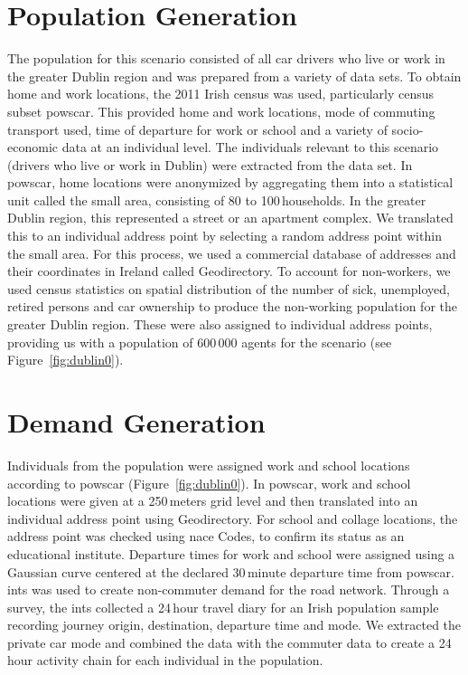 \section{Population Generation}
The population for this scenario consisted of all car drivers who live or work in the greater Dublin region and was prepared from a variety of data sets. To obtain home and work locations, the 2011 Irish census was used, particularly census subset \gls{powscar}. This provided home and work locations, mode of commuting transport used, time of departure for work or school and a variety of socio-economic data at an individual level. The individuals relevant to this scenario (drivers who live or work in Dublin) were extracted from the data set. In \gls{powscar}, home locations were anonymized by aggregating them into a statistical unit called the small area, consisting of 80 to 100\,households.  In the greater Dublin region, this represented a street or an apartment complex. We translated this to an individual address point by selecting a random address point within the small area. For this process, we used a commercial database of addresses and their coordinates in Ireland called Geodirectory. To account for non-workers, we used census statistics on spatial distribution of the number of sick, unemployed, retired persons and car ownership to produce the non-working population for the greater Dublin region. These were also assigned to individual address points, providing us with a population of 600\,000 agents for the scenario (see Figure~\ref{fig:dublin0}).

\section{Demand Generation}
Individuals from the population were assigned work and school locations according to \gls{powscar} (Figure~\ref{fig:dublin0}). In \gls{powscar}, work and school locations were given at a 250\,meters grid level and then translated into an individual address point using Geodirectory. For school and collage locations, the address point was checked using \gls{nace} Codes, to confirm its status as an educational institute. Departure times for work  and school were assigned using a Gaussian curve centered at the declared 30\,minute departure time from \gls{powscar}.  \gls{ints} was used to create non-commuter demand for the road network. Through a survey, the \gls{ints} collected a 24\,hour travel diary for an Irish population sample recording journey origin, destination, departure time and mode. We extracted the private car mode and combined the data with the commuter data to create a 24\,hour activity chain for each individual in the population.

